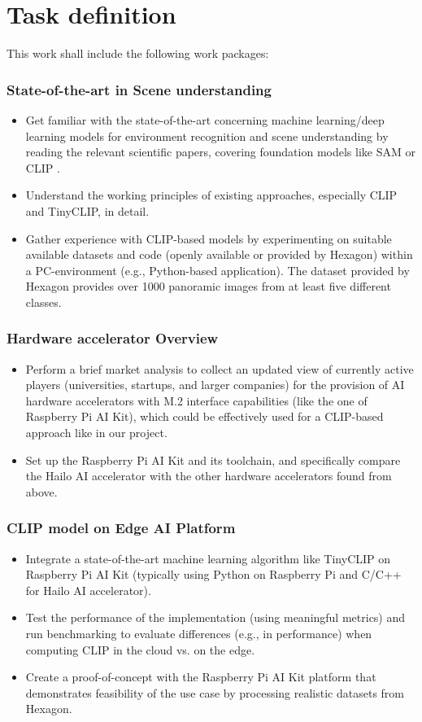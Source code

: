 \chapter{Task definition}
This work shall include the following work packages:
\subsection*{State-of-the-art in Scene understanding}
\begin{itemize}
    \item Get familiar with the state-of-the-art concerning machine learning/deep learning models for environment recognition and scene understanding by reading the relevant scientific papers, covering foundation models like SAM\cite{sam} or CLIP \cite{clip}.
    \item Understand the working principles of existing approaches, especially CLIP and TinyCLIP\cite{tinyclip}, in detail.
    \item Gather experience with CLIP-based models by experimenting on suitable available datasets and code (openly available or provided by Hexagon) within a PC-environment (e.g., Python-based application). The dataset provided by Hexagon provides over 1000 panoramic images from at least five different classes.
\end{itemize}

\subsection*{Hardware accelerator Overview}
\begin{itemize}
    \item Perform a brief market analysis to collect an updated view of currently active players (universities, startups, and larger companies) for the provision of AI hardware accelerators with M.2 interface capabilities (like the one of Raspberry Pi AI Kit), which could be effectively used for a CLIP-based approach like in our project.
    \item Set up the Raspberry Pi AI Kit and its toolchain, and specifically compare the Hailo AI accelerator with the other hardware accelerators found from above.
\end{itemize}

\subsection*{CLIP model on Edge AI Platform}
\begin{itemize}
    \item Integrate a state-of-the-art machine learning algorithm like TinyCLIP on Raspberry Pi AI Kit (typically using Python on Raspberry Pi and C/C++ for Hailo AI accelerator).
    \item Test the performance of the implementation (using meaningful metrics) and run benchmarking to evaluate differences (e.g., in performance) when computing CLIP in the cloud vs. on the edge.
    \item Create a proof-of-concept with the Raspberry Pi AI Kit platform that demonstrates feasibility of the use case by processing realistic datasets from Hexagon.
\end{itemize}

